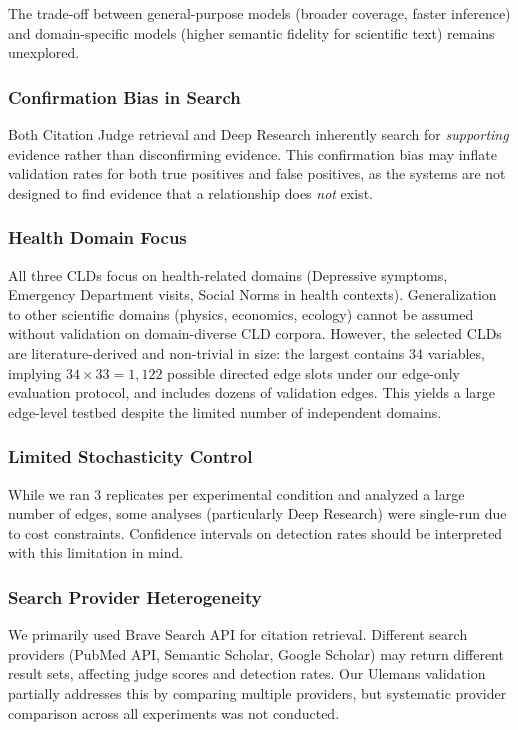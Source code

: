 The trade-off between general-purpose models (broader coverage, faster inference) and domain-specific models (higher semantic fidelity for scientific text) remains unexplored.

\subsubsection{Confirmation Bias in Search}

Both Citation Judge retrieval and Deep Research inherently search for \textit{supporting} evidence rather than disconfirming evidence. This confirmation bias may inflate validation rates for both true positives and false positives, as the systems are not designed to find evidence that a relationship does \textit{not} exist.

\subsubsection{Health Domain Focus}

All three CLDs focus on health-related domains (Depressive symptoms, Emergency Department visits, Social Norms in health contexts). Generalization to other scientific domains (physics, economics, ecology) cannot be assumed without validation on domain-diverse CLD corpora. However, the selected CLDs are literature-derived and non-trivial in size: the largest contains 34 variables, implying $34 \times 33 = 1{,}122$ possible directed edge slots under our edge-only evaluation protocol, and includes dozens of validation edges. This yields a large edge-level testbed despite the limited number of independent domains.

\subsubsection{Limited Stochasticity Control}

While we ran 3 replicates per experimental condition and analyzed a large number of edges, some analyses (particularly Deep Research) were single-run due to cost constraints. Confidence intervals on detection rates should be interpreted with this limitation in mind.

\subsubsection{Search Provider Heterogeneity}

We primarily used Brave Search API for citation retrieval. Different search providers (PubMed API, Semantic Scholar, Google Scholar) may return different result sets, affecting judge scores and detection rates. Our Ulemans validation partially addresses this by comparing multiple providers, but systematic provider comparison across all experiments was not conducted.

